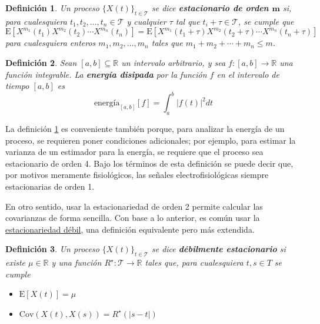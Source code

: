 \documentclass[12pt,letterpaper]{book}
\newtheorem{definicion}{Definición}[chapter]
\newcommand{\R}{\mathbb{R}}
\newcommand{\E}[1]{\mathrm{E}\left[ #1 \right]}
\newcommand{\Var}[1]{\mathrm{Var}\left( #1 \right)}
\newcommand{\Cov}[1]{\mathrm{Cov}\left( #1 \right)}
\newcommand{\abso}[1]{\left| #1 \right|}
\newcommand{\xt}{$\{X(t)\}_{t\in \mathcal{T}}$ }
\begin{document}
\begin{definicion}%
\label{est_m}
Un proceso \xt se dice \textbf{estacionario de orden $\boldsymbol{m}$} si, para cualesquiera $t_1, t_2, \dots, t_n \in \mathcal{T}$ y cualquier $\tau$ tal que $t_i + \tau \in \mathcal{T}$, se cumple que
\begin{equation}
\E{X^{m_1}(t_1)X^{m_2}(t_2)\cdots X^{m_n}(t_n)} =
\E{X^{m_1}(t_1+\tau)X^{m_2}(t_2+\tau)\cdots X^{m_n}(t_n+\tau)}
\end{equation}
para cualesquiera enteros $m_1, m_2, \dots, m_n$ tales que $m_1+m_2+\cdots+m_n \leq m$.
\end{definicion}

\begin{definicion}
\label{lazy5}
Sean $[a,b] \subseteq \R$ un intervalo arbitrario, y sea $f: [a,b] \rightarrow \R$ una función integrable. La \textbf{energía disipada} por la función $f$ en el intervalo de tiempo $[a,b]$ es
\begin{equation}
\text{energía}_{[a,b]}[f] = \int_a^{b} \abso{f(t)}^{2} dt
\end{equation}
\end{definicion}

La definición \ref{est_m} es conveniente también porque, para analizar la energía de un proceso, se requieren poner condiciones adicionales; por ejemplo, para estimar la varianza de un estimador para la energía, se requiere que el proceso sea estacionario de orden 4.
%
Bajo los términos de esta definición se puede decir que, por motivos meramente fisiológicos, las señales electrofisiológicas siempre estacionarias de orden 1.

En otro sentido, usar la estacionariedad de orden 2 permite calcular las covarianzas de forma sencilla. 
%
Con base a lo anterior, es común usar la \underline{estacionariedad débil}, una definición equivalente pero más extendida.

\begin{definicion}%
Un proceso \xt se dice \textbf{débilmente estacionario} si existe $\mu \in \R$ y una función $R^\star : \mathcal{T} \rightarrow \R $ tales que, para cualesquiera $t, s \in T$ se 
cumple
\begin{itemize}
\item $\E{X(t)} = \mu$
\item $\Cov{X(t),X(s)} = R^\star(\abso{s-t})$
\end{itemize}
\end{definicion}
\end{document}
